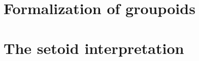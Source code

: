 \documentclass[runningheads,a4paper]{llncs}
\begin{document}




\section{Formalization of groupoids}
\label{sec:formalization}



\section{The setoid interpretation}
\label{sec:interpretation}











% 

%











% 


% 




\end{document}
